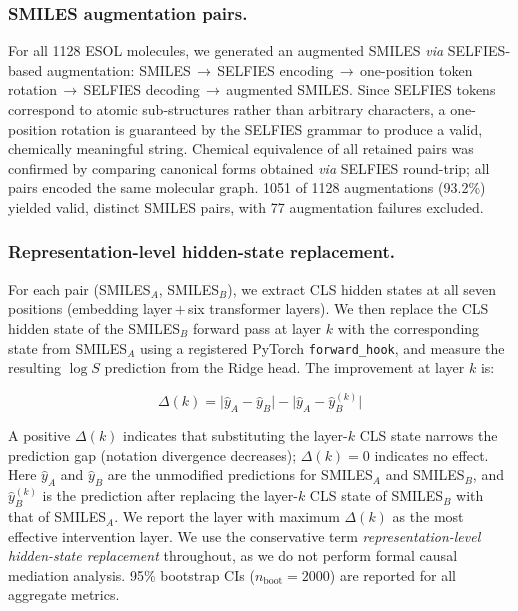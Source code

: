 \documentclass[twoside,twocolumn,9pt]{article}
\newcommand{\logS}{\ensuremath{\log S}}
\begin{document}
\subsubsection{SMILES augmentation pairs.~~} For all 1128 ESOL molecules, we generated an augmented SMILES \textit{via} SELFIES-based augmentation: SMILES\,$\to$\,SELFIES encoding\,$\to$\,one-position token rotation\,$\to$\,SELFIES decoding\,$\to$\,augmented SMILES. Since SELFIES tokens correspond to atomic sub-structures rather than arbitrary characters, a one-position rotation is guaranteed by the SELFIES grammar to produce a valid, chemically meaningful string. Chemical equivalence of all retained pairs was confirmed by comparing canonical forms obtained \textit{via} SELFIES round-trip; all pairs encoded the same molecular graph. 1051 of 1128 augmentations (93.2\%) yielded valid, distinct SMILES pairs, with 77 augmentation failures excluded.

\subsubsection{Representation-level hidden-state replacement.~~} For each pair (SMILES$_A$, SMILES$_B$), we extract CLS hidden states at all seven positions (embedding layer\,$+$\,six transformer layers). We then replace the CLS hidden state of the SMILES$_B$ forward pass at layer $k$ with the corresponding state from SMILES$_A$ using a registered PyTorch \texttt{forward\_hook}, and measure the resulting $\logS$ prediction from the Ridge head. The improvement at layer $k$ is:

\begin{equation}
  \Delta(k) = \bigl|\hat{y}_A - \hat{y}_B\bigr| - \bigl|\hat{y}_A - \hat{y}_{B}^{(k)}\bigr|
  \label{eq:improvement}
\end{equation}

A positive $\Delta(k)$ indicates that substituting the layer-$k$ CLS state narrows the prediction gap (notation divergence decreases); $\Delta(k)=0$ indicates no effect. Here $\hat{y}_A$ and $\hat{y}_B$ are the unmodified predictions for SMILES$_A$ and SMILES$_B$, and $\hat{y}_{B}^{(k)}$ is the prediction after replacing the layer-$k$ CLS state of SMILES$_B$ with that of SMILES$_A$. We report the layer with maximum $\Delta(k)$ as the most effective intervention layer. We use the conservative term \textit{representation-level hidden-state replacement} throughout, as we do not perform formal causal mediation analysis. 95\% bootstrap CIs ($n_\text{boot}=2000$) are reported for all aggregate metrics.
\end{document}
